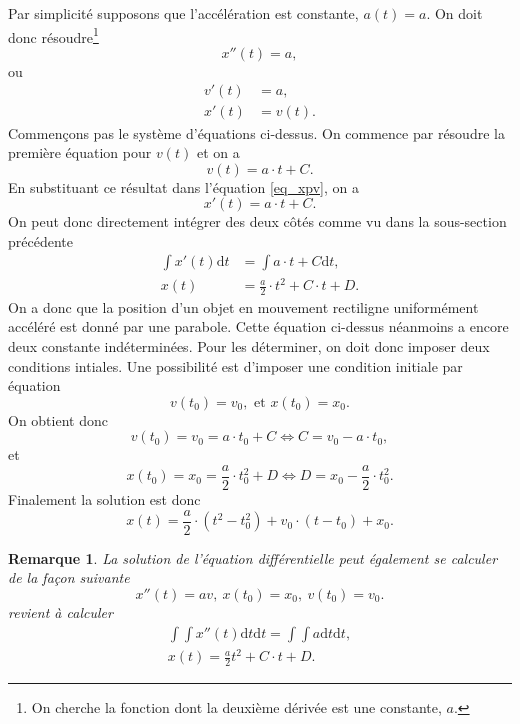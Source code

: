 \documentclass[a4paper,12pt]{book}
\newcommand{\dd}{\mathrm{d}}
\newtheorem*{remarque}{Remarque}
\begin{document}
Par simplicité supposons que l'accélération est constante, $a(t)=a$. On doit donc résoudre\footnote{On cherche la fonction dont la deuxième dérivée est une constante, $a$.}
\begin{equation}
x''(t)=a,
\end{equation}
ou 
\begin{align}
v'(t)&=a,\\
x'(t)&=v(t).\label{eq_xpv}
\end{align}
Commen\c cons pas le système d'équations ci-dessus. On commence par résoudre 
la première équation pour $v(t)$ et on a
\begin{equation}
 v(t)=a\cdot t+C.
\end{equation}
En substituant ce résultat dans l'équation \eqref{eq_xpv}, on a
\begin{equation}
 x'(t)=a\cdot t+C.
\end{equation}
On peut donc directement intégrer des deux côtés comme vu dans la sous-section précédente
\begin{align}
 \int x'(t)\dd t&=\int a\cdot t+C\dd t,\nonumber\\
 x(t)&=\frac{a}{2}\cdot t^2+C\cdot t + D.
\end{align}
On a donc que la position d'un objet en mouvement rectiligne uniformément accéléré est donné par une
parabole. Cette équation ci-dessus néanmoins a encore deux constante indéterminées. Pour les déterminer, on doit donc imposer
deux conditions intiales. Une possibilité est d'imposer une condition initiale par équation
\begin{equation}
 v(t_0)=v_0,\mbox{ et } x(t_0)=x_0.
\end{equation}
On obtient donc 
\begin{equation}
 v(t_0)=v_0=a\cdot t_0+C \Leftrightarrow C=v_0-a\cdot t_0,
\end{equation}
et
\begin{equation}
 x(t_0)=x_0=\frac{a}{2}\cdot t_0^2+D \Leftrightarrow D=x_0-\frac{a}{2}\cdot t_0^2.
\end{equation}
Finalement la solution est donc
\begin{equation}
 x(t)=\frac{a}{2}\cdot (t^2-t_0^2)+v_0\cdot (t-t_0)+x_0.
\end{equation}

\begin{remarque}
La solution de l'équation différentielle peut également se calculer de la façon suivante
\begin{equation}
 x''(t)=av,\ x(t_0)=x_0,\ v(t_0)=v_0.
\end{equation}
revient à calculer 
\begin{align*}
 \int \int x''(t)\dd t\dd t=\int \int a \dd t\dd t,\\
 x(t)=\frac{a}{2}t^2+C\cdot t + D.
\end{align*}
\end{remarque}
\end{document}
